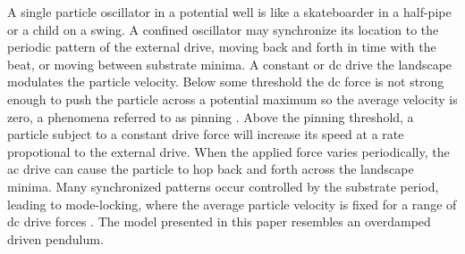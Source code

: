 \documentclass[twocolumn,preprintnumbers,amsmath,amssymb,aps,prx]{revtex4}
\begin{document}
A single particle oscillator
in a potential well is 
like a skateboarder in a half-pipe or
a child on a swing.
 A confined oscillator may 
 synchronize its location
 to the periodic pattern of the external drive,
 moving back and forth in time with
 the beat,
 or moving between substrate minima.
 A constant or 
 dc drive the landscape modulates 
 the particle velocity.
 Below some threshold  
 the dc force is not strong enough to push the particle
 across a potential maximum so the average velocity is zero,
 a phenomena referred to as pinning \cite{Reichhardt2017}.
 Above the pinning threshold,
 a particle subject to a constant
 drive force will increase its speed at a rate propotional
 to the external drive.  
 When the applied force varies periodically,
 the ac drive can 
 cause the particle to hop back and forth across
 the landscape minima.
 Many synchronized patterns occur
 controlled by the substrate period,
 leading to 
 mode-locking,
 where the average particle velocity
 is fixed for a range of dc drive forces \cite{Reichhardt2015}.
 The model presented in this paper
 resembles an overdamped driven pendulum. 
\end{document}
